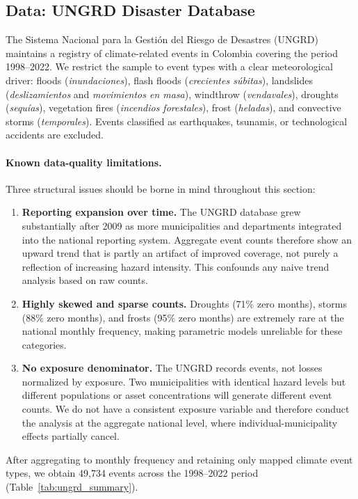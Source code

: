 \documentclass[12pt]{article}
\begin{document}
\subsection{Data: UNGRD Disaster Database}

The Sistema Nacional para la Gesti\'on del Riesgo de Desastres (\textsc{UNGRD}) maintains a registry of climate-related events in Colombia covering the period 1998--2022. We restrict the sample to event types with a clear meteorological driver: floods (\emph{inundaciones}), flash floods (\emph{crecientes s\'ubitas}), landslides (\emph{deslizamientos} and \emph{movimientos en masa}), windthrow (\emph{vendavales}), droughts (\emph{sequ\'ias}), vegetation fires (\emph{incendios forestales}), frost (\emph{heladas}), and convective storms (\emph{temporales}). Events classified as earthquakes, tsunamis, or technological accidents are excluded.

\paragraph{Known data-quality limitations.}
Three structural issues should be borne in mind throughout this section:
\begin{enumerate}
\item \textbf{Reporting expansion over time.} The UNGRD database grew substantially after 2009 as more municipalities and departments integrated into the national reporting system. Aggregate event counts therefore show an upward trend that is partly an artifact of improved coverage, not purely a reflection of increasing hazard intensity. This confounds any naive trend analysis based on raw counts.
\item \textbf{Highly skewed and sparse counts.} Droughts (71\% zero months), storms (88\% zero months), and frosts (95\% zero months) are extremely rare at the national monthly frequency, making parametric models unreliable for these categories.
\item \textbf{No exposure denominator.} The UNGRD records events, not losses normalized by exposure. Two municipalities with identical hazard levels but different populations or asset concentrations will generate different event counts. We do not have a consistent exposure variable and therefore conduct the analysis at the aggregate national level, where individual-municipality effects partially cancel.
\end{enumerate}

After aggregating to monthly frequency and retaining only mapped climate event types, we obtain 49,734 events across the 1998--2022 period (Table~\ref{tab:ungrd_summary}).
\end{document}
